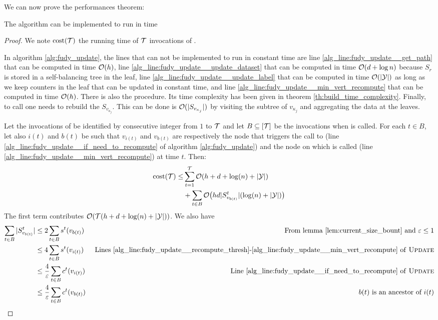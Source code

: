 We can now prove the performances theorem:
\begin{theorem}
    The \AlgoUpdate{} algorithm can be implemented to run in time 
\end{theorem}
\begin{proof}
    We note $\text{cost}(\mathcal{T})$ the running time of $\mathcal{T}$ invocations of \AlgoUpdate{}.

    In algorithm \ref{alg:fudy_update}, the lines that can not be implemented to run in constant time are line \ref{alg_line:fudy_update__get_path} that can be computed in time $\mathcal{O}(h)$, line \ref{alg_line:fudy_update__update_dataset} that can be computed in time $\mathcal{O}(d + \log n)$ because $S_r$ is stored in a self-balancing tree in the leaf, line \ref{alg_line:fudy_update__update_label} that can be computed in time $\mathcal{O}(|\mathcal{Y}|)$ as long as we keep counters in the leaf that can be updated in constant time, and line \ref{alg_line:fudy_update__min_vert_recompute} that can be computed in time $\mathcal{O}(h)$. There is also the \AlgoBuild{} procedure. Its time complexity has been given in theorem \ref{th:build_time_complexity}. Finally, to call \AlgoBuild{} one needs to rebuild the $S_{v_{\kappa_j}}$. This can be done is $\mathcal{O}(|S_{v_{\kappa_j}}|)$ by visiting the subtree of $v_{\kappa_j}$ and aggregating the data at the leaves. 

    Let the invocations of \AlgoUpdate{} be identified by consecutive integer from $1$ to $\mathcal{T}$ and let $B \subseteq [\mathcal{T}]$ be the invocations when \AlgoBuild{} is called. For each $t\in B$, let also $i(t)$ and $b(t)$ be such that $v_{i(t)}$ and $v_{b(t)}$ are respectively the node that triggers the call to \AlgoBuild{} (line \ref{alg_line:fudy_update__if_need_to_recompute} of algorithm \ref{alg:fudy_update}) and the node on which \AlgoBuild{} is called (line \ref{alg_line:fudy_update__min_vert_recompute}) at time $t$. Then:
    \begin{equation*}
        \begin{split}
            \text{cost}(\mathcal{T}) \leq &\sum_{t=1}^{\mathcal{T}} \mathcal{O}(h + d + \log(n) + |\mathcal{Y}|)\\
            & + \sum_{t \in B} \mathcal{O}\big(hd|S_{v_{b(t)}}^t|(\log(n) + |\mathcal{Y}|)\big)
        \end{split}
    \end{equation*}
    The first term contributes $\mathcal{O}(\mathcal{T}(h + d + \log(n) + |\mathcal{Y}|))$. We also have
    \begin{align*}
        \sum_{t\in B}|S_{v_{b(t)}}^t| & \leq 2 \sum_{t\in B} s^t(v_{b(t)}) &\text{ From lemma \ref{lem:current_size_bount} and $\varepsilon \leq 1$}\\
        & \leq 4 \sum_{t\in B} s^t(v_{i(t)}) & \text{ Lines \ref{alg_line:fudy_update__recompute_thresh}-\ref{alg_line:fudy_update__min_vert_recompute} of \textsc{Update}{}}\\
        & \leq \frac{4}{\varepsilon} \sum_{t\in B} c^t(v_{i(t)}) & \text{ Line \ref{alg_line:fudy_update__if_need_to_recompute} of \textsc{Update}{}}\\
        & \leq \frac{4}{\varepsilon} \sum_{t\in B} c^t(v_{b(t)}) & \text{ $b(t)$ is an ancestor of $i(t)$}
    \end{align*}


\end{proof}
